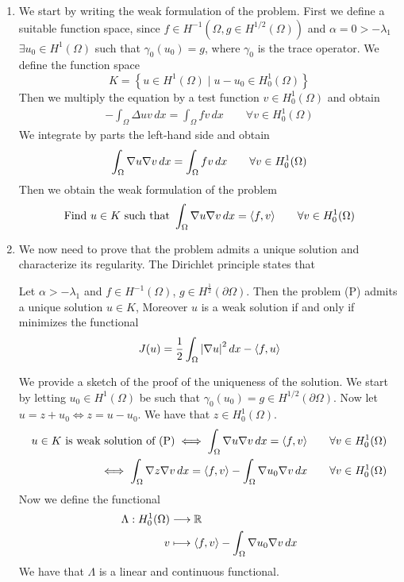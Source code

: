 \begin{enumerate}
    \item We start by writing the weak formulation of the problem. First we define a suitable function space, since \(f \in H^{-1}(\Omega, g \in H^{1/2}(\Omega))\) and \(\alpha = 0 > -\lambda_1\) \(\exists u_0 \in H^1(\Omega)\) such that \(\gamma_0(u_0) = g\), where \(\gamma_0\) is the trace operator. We define the function space
    \[
        K = \left\{ u \in H^1(\Omega) \mid u - u_0 \in H^1_0(\Omega) \right\}
    \]
    Then we multiply the equation by a test function \(v \in H^1_0(\Omega)\) and obtain
    \[
        \begin{split}
            -\int_\Omega \Delta u v \, dx = \int_\Omega f v \, dx \qquad \forall v \in H^1_0(\Omega)
        \end{split}
    \]
    We integrate by parts the left-hand side and obtain
    \[
        \begin{split}
            \int_\Omega \nabla u \nabla v \, dx = \int_\Omega f v \, dx \qquad \forall v \in H^1_0(\Omega)
        \end{split}
    \]
    Then we obtain the weak formulation of the problem
    \[
        \begin{split}
            \text{Find } u \in K \text{ such that } \int_\Omega \nabla u \nabla v \, dx =  \langle f, v \rangle \qquad \forall v \in H^1_0(\Omega)
        \end{split}
    \]
    \item We now need to prove that the problem admits a unique solution and characterize its regularity. The Dirichlet principle states that 
    \begin{remark}
        Let \(\alpha > -\lambda_1\) and \(f \in H^{-1}(\Omega)\), \(g \in H^{\frac{1}{2}}(\partial\Omega)\). Then the problem (P) admits a unique solution \(u \in K\), Moreover \(u\) is a weak solution if and only if minimizes the functional
        \[
            J(u) = \frac{1}{2} \int_\Omega \abs{\nabla u}^2 \, dx - \langle f, u \rangle
        \]
    \end{remark}
    We provide a sketch of the proof of the uniqueness of the solution. We start by letting \(u_0 \in H^1(\Omega)\) be such that \(\gamma_0(u_0) = g \in H^{1/2}(\partial\Omega)\). Now let \(u = z + u_0 \iff z = u - u_0\). We have that \(z \in H^1_0(\Omega)\). 
    \[
        \begin{split}
            u \in K \text{ is weak solution of (P)} \iff \int_\Omega \nabla u \nabla v \, dx = \langle f, v \rangle \qquad \forall v \in H^1_0(\Omega) \\
            \iff \int_\Omega \nabla z \nabla v \, dx = \langle f, v \rangle - \int_\Omega \nabla u_0 \nabla v \, dx \qquad \forall v \in H^1_0(\Omega) 
        \end{split}
    \]
    Now we define the functional
    \begin{align*}
        \Lambda: H^1_0(\Omega) &\longrightarrow \mathbb{R} \\
        v &\longmapsto \langle f, v \rangle - \int_\Omega \nabla u_0 \nabla v \, dx
    \end{align*}
    We have that \(\Lambda\) is a linear and continuous functional. 


\end{enumerate}
